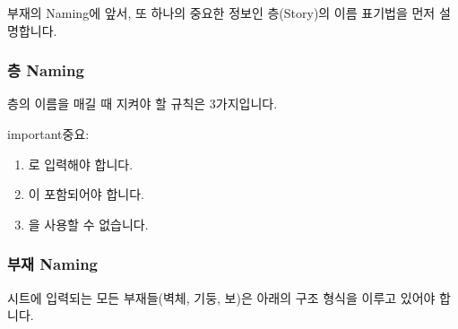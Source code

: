 \documentclass[a4paper,10pt,korean]{sphinxmanual}
\begin{document}
\sphinxAtStartPar
부재의 Naming에 앞서, 또 하나의 중요한 정보인 층(Story)의 이름 표기법을 먼저 설명합니다.


\subsubsection{층 Naming}
\label{\detokenize{2_naming_rules:naming}}
\sphinxAtStartPar
층의 이름을 매길 때 지켜야 할 규칙은 3가지입니다.

\begin{sphinxadmonition}{important}{중요:}\begin{enumerate}
%
\item {} 
\sphinxAtStartPar
{}로 입력해야 합니다.

\item {} 
\sphinxAtStartPar
{}이 포함되어야 합니다.

\item {} 
\sphinxAtStartPar
{}을 사용할 수 없습니다.

\end{enumerate}
\end{sphinxadmonition}

\begin{figure}[htbp]
\centering
\capstart

\noindent{}
\caption{}\label{\detokenize{2_naming_rules:id3}}\end{figure}


\subsubsection{부재 Naming}
\label{\detokenize{2_naming_rules:id2}}
\sphinxAtStartPar
시트에 입력되는 모든 부재들(벽체, 기둥, 보)은 아래의 구조 형식을 이루고 있어야 합니다.
\end{document}
